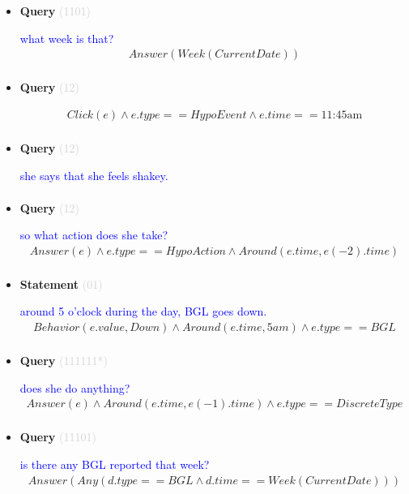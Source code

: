 \documentclass[11pt]{article}
\newcommand{\key}[1]{\textcolor{lightgray}{#1}}
\newcounter{CQuery}
\newcounter{CStatement}
\begin{document}
\begin{itemize}
\item
\textbf{Query\theCQuery} \key{(1101)} \addtocounter{CQuery}{1}
\textcolor{blue}{ what week is that? }
\begin{multline*}
Answer(Week(CurrentDate)) \\ 
\end{multline*}


\item
\textbf{Query\theCQuery} \key{(12)} \addtocounter{CQuery}{1}
\textcolor{blue}{  }
\begin{multline*}
Click(e) \wedge e.type == HypoEvent \wedge e.time == \mbox{11:45am} \\ 
\end{multline*}


\item
\textbf{Query\theCQuery} \key{(12)} \addtocounter{CQuery}{1}
\textcolor{blue}{ she says that she feels shakey. }
\begin{multline*}
\end{multline*}


\item
\textbf{Query\theCQuery} \key{(12)} \addtocounter{CQuery}{1}
\textcolor{blue}{ so what action does she take? }
\begin{multline*}
Answer(e) \wedge e.type == HypoAction \wedge Around(e.time, e(-2).time) \\ 
\end{multline*}


\item
\textbf{Statement\theCStatement} \key{(01)} \addtocounter{CStatement}{1}
\textcolor{blue}{ around 5 o'clock during the day, BGL goes down. }
\begin{multline*}
Behavior(e.value, Down) \wedge Around(e.time, 5am) \wedge e.type==BGL \\ 
\end{multline*}


\item
\textbf{Query\theCQuery} \key{(111111*)} \addtocounter{CQuery}{1}
\textcolor{blue}{ does she do anything? }
\begin{multline*}
Answer(e) \wedge Around(e.time, e(-1).time) \wedge e.type==DiscreteType \\ 
\end{multline*}


\item
\textbf{Query\theCQuery} \key{(11101)} \addtocounter{CQuery}{1}
\textcolor{blue}{ is there any BGL reported that week? }
\begin{multline*}
Answer(Any(d.type==BGL \wedge d.time==Week(CurrentDate))) \\ 
\end{multline*}



\end{itemize}
\end{document}
